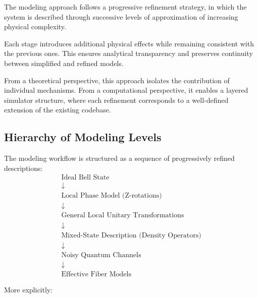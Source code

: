 \documentclass[a4paper]{article}
\begin{document}
The modeling approach follows a progressive refinement strategy, in which the system is described through successive levels of approximation of increasing physical complexity.

Each stage introduces additional physical effects while remaining consistent with the previous ones. This ensures analytical transparency and preserves continuity between simplified and refined models.

From a theoretical perspective, this approach isolates the contribution of individual mechanisms. From a computational perspective, it enables a layered simulator structure, where each refinement corresponds to a well-defined extension of the existing codebase.


\subsection{Hierarchy of Modeling Levels}

The modeling workflow is structured as a sequence of progressively refined descriptions:
\[
\begin{array}{c}
\text{Ideal Bell State} \\
\downarrow \\
\text{Local Phase Model (Z-rotations)} \\
\downarrow \\
\text{General Local Unitary Transformations} \\
\downarrow \\
\text{Mixed-State Description (Density Operators)} \\
\downarrow \\
\text{Noisy Quantum Channels} \\
\downarrow \\
\text{Effective Fiber Models}
\end{array}
\]

More explicitly:
\end{document}
